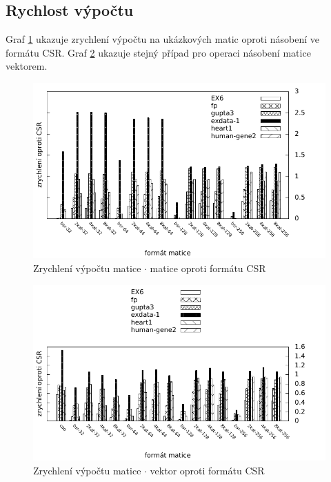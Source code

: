 \subsection{Rychlost výpočtu}

Graf \ref{fig:mmmspeed} ukazuje zrychlení výpočtu na ukázkových matic oproti násobení ve formátu CSR. Graf \ref{fig:mvmspeed} ukazuje stejný případ pro operaci násobení matice vektorem.

\begin{figure}[H]
	\includegraphics[width=1.0\textwidth]{./images/measure1/mmm-speedup}
	\caption{Zrychlení výpočtu matice $\cdot$ matice oproti formátu CSR}
	\label{fig:mmmspeed}
\end{figure}

\begin{figure}[H]
	\includegraphics[width=1.0\textwidth]{./images/measure1/mvm-speedup}
	\caption{Zrychlení výpočtu matice $\cdot$ vektor oproti formátu CSR}
	\label{fig:mvmspeed}
\end{figure}


